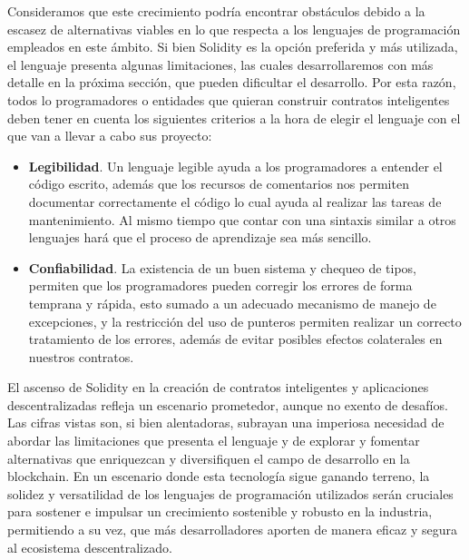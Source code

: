 \documentclass[a4paper,10pt]{article}
\begin{document}
	Consideramos que este crecimiento podría encontrar obstáculos debido a la escasez de alternativas viables en lo que respecta a los lenguajes de programación empleados en este ámbito. Si bien Solidity es la opción preferida y más utilizada, el lenguaje presenta algunas limitaciones, las cuales desarrollaremos con más detalle en la próxima sección, que pueden dificultar el desarrollo. Por esta razón, todos lo programadores o entidades que quieran construir contratos inteligentes deben tener en cuenta los siguientes criterios a la hora de elegir el lenguaje con el que van a llevar a cabo sus proyecto:
	\begin{itemize}
		\item \textbf{Legibilidad}. Un lenguaje legible ayuda a los programadores a entender el código escrito, además que los recursos de comentarios nos permiten documentar correctamente el código lo cual ayuda al realizar las tareas de mantenimiento. Al mismo tiempo que contar con una sintaxis similar a otros lenguajes hará que el proceso de aprendizaje sea más sencillo.
		\item \textbf{Confiabilidad}. La existencia de un buen sistema y chequeo de tipos, permiten que los programadores pueden corregir los errores de forma temprana y rápida, esto sumado a un adecuado mecanismo de manejo de excepciones, y la restricción del uso de punteros permiten realizar un correcto tratamiento de los errores, además de evitar posibles efectos colaterales en nuestros contratos.
	\end{itemize}
	El ascenso de Solidity en la creación de contratos inteligentes y aplicaciones descentralizadas refleja un escenario prometedor, aunque no exento de desafíos. Las cifras vistas son, si bien alentadoras, subrayan una imperiosa necesidad de abordar las limitaciones que presenta el lenguaje y de explorar y fomentar alternativas que enriquezcan y diversifiquen el campo de desarrollo en la blockchain. En un escenario donde esta tecnología sigue ganando terreno, la solidez y versatilidad de los lenguajes de programación utilizados serán cruciales para sostener e impulsar un crecimiento sostenible y robusto en la industria, permitiendo a su vez, que más desarrolladores aporten de manera eficaz y segura al ecosistema descentralizado.
\end{document}
